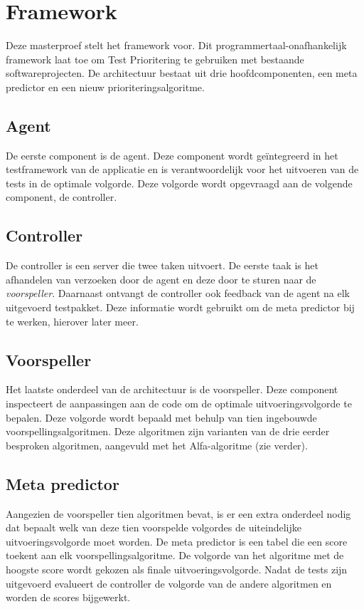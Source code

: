 \section{Framework}
\noindent Deze masterproef stelt het \velocity{} framework voor. Dit programmertaal-onafhankelijk framework laat toe om Test Prioritering te gebruiken met bestaande softwareprojecten. De architectuur bestaat uit drie hoofdcomponenten, een meta predictor en een nieuw prioriteringsalgoritme.

\subsection{Agent}
\noindent De eerste component is de agent. Deze component wordt ge\"integreerd in het testframework van de applicatie en is verantwoordelijk voor het uitvoeren van de tests in de optimale volgorde. Deze volgorde wordt opgevraagd aan de volgende component, de controller.

\subsection{Controller}
\noindent De controller is een server die twee taken uitvoert. De eerste taak is het afhandelen van verzoeken door de agent en deze door te sturen naar de \emph{voorspeller}. Daarnaast ontvangt de controller ook feedback van de agent na elk uitgevoerd testpakket. Deze informatie wordt gebruikt om de meta predictor bij te werken, hierover later meer.

\subsection{Voorspeller}
\noindent Het laatste onderdeel van de architectuur is de voorspeller. Deze component inspecteert de aanpassingen aan de code om de optimale uitvoeringsvolgorde te bepalen. Deze volgorde wordt bepaald met behulp van tien ingebouwde voorspellingsalgoritmen. Deze algoritmen zijn varianten van de drie eerder besproken algoritmen, aangevuld met het Alfa-algoritme (zie verder).

\subsection{Meta predictor}
\noindent Aangezien de voorspeller tien algoritmen bevat, is er een extra onderdeel nodig dat bepaalt welk van deze tien voorspelde volgordes de uiteindelijke uitvoeringsvolgorde moet worden. De meta predictor is een tabel die een score toekent aan elk voorspellingsalgoritme. De volgorde van het algoritme met de hoogste score wordt gekozen als finale uitvoeringsvolgorde. Nadat de tests zijn uitgevoerd evalueert de controller de volgorde van de andere algoritmen en worden de scores bijgewerkt.

